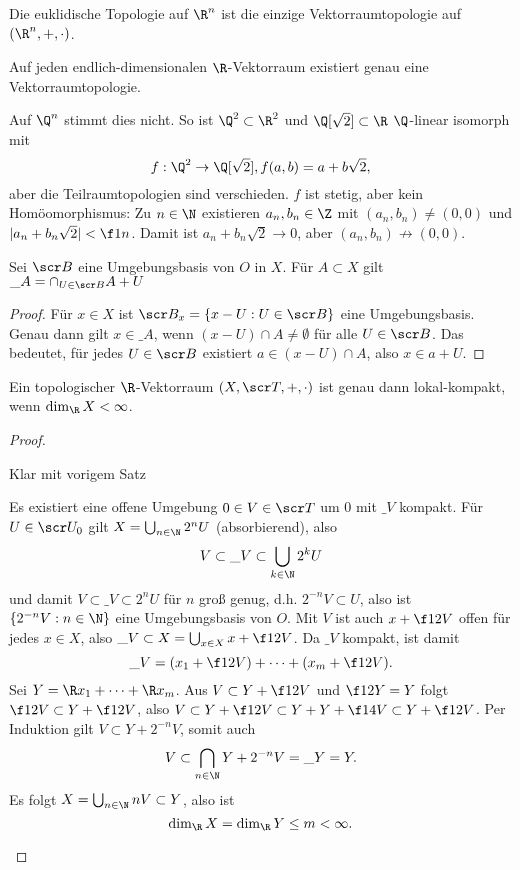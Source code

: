 \begin{kor}
	Die euklidische Topologie auf $\R^n$ ist die einzige Vektorraumtopologie auf $(\R^n, +, \cdot)$.

	Auf jeden endlich-dimensionalen $\R$-Vektorraum existiert genau eine Vektorraumtopologie.
	\begin{note}
		Auf $\Q^n$ stimmt dies nicht.
		So ist $\Q^2 \subset \R^2$ und $\Q[\sqrt 2] \subset \R$ $\Q$-linear isomorph mit
		\[
			f: \Q^2 \to \Q[\sqrt 2], f(a,b) = a + b \sqrt{2},
		\]
		aber die Teilraumtopologien sind verschieden.
		$f$ ist stetig, aber kein Homöomorphismus:
		Zu $n \in \N$ existieren $a_n, b_n \in \Z$ mit $(a_n, b_n) \neq (0,0)$ und $|a_n + b_n \sqrt{2}| < \f 1n$.
		Damit ist $a_n + b_n \sqrt{2} \to 0$, aber $(a_n, b_n) \not\to (0,0)$.
	\end{note}
\end{kor}

\begin{lem}
	Sei $\scr B$ eine Umgebungsbasis von $O$ in $X$.
	Für $A \subset X$ gilt $\_A = \cap_{U \in \scr B} A + U$
	\begin{proof}
		Für $x \in X$ ist $\scr B_x = \{ x - U : U \in \scr B\}$ eine Umgebungsbasis.
		Genau dann gilt $x \in \_A$, wenn $(x-U) \cap A \neq \emptyset$ für alle $U \in \scr B$.
		Das bedeutet, für jedes $U \in \scr B$ existiert $a \in (x-U) \cap A$, also $x \in a + U$.
	\end{proof}
\end{lem}

\begin{st}
	Ein topologischer $\R$-Vektorraum $(X, \scr T, +, \cdot)$ ist genau dann lokal-kompakt, wenn $\dim_{\R} X < \infty$.
	\begin{proof}
		\begin{segnb}[„$\impliedby$“]
			Klar mit vorigem Satz
		\end{segnb}
		\begin{segnb}[„$\implies$“]
			Es existiert eine offene Umgebung $0 \in V \in \scr T$ um $0$ mit $\_V$ kompakt.
			Für $U \in \scr U_0$ gilt $X = \bigcup_{n\in\N} 2^n U$ (absorbierend), also
			\[
				V \subset \_V \subset \bigcup_{k\in\N}2^k U
			\]
			und damit $V \subset \_V \subset 2^n U$ für $n$ groß genug, d.h. $2^{-n} V \subset U$, also ist $\{2^{-n} V : n\in \N\}$ eine Umgebungsbasis von $O$.
			Mit $V$ ist auch $x + \f 12 V$ offen für jedes $x \in X$, also $\_V \subset X = \bigcup_{x\in X} x + \f 12 V$.
			Da $\_V$ kompakt, ist damit
			\[
				\_V = (x_1 + \f 12 V) + \dotsb + (x_m + \f 12 V).
			\]
			Sei $Y = \R x_1 + \dotsb + \R x_m$.
			Aus $V \subset Y + \f 12 V$ und $\f 12 Y = Y$ folgt $\f 12 V \subset Y + \f 12 V$, also $V \subset Y + \f 12 V \subset Y + Y + \f 14 V \subset Y + \f 12 V$.
			Per Induktion gilt $V \subset Y + 2^{-n}V$, somit auch
			\[
				V
				\subset \bigcap_{n\in\N} Y + 2^{-n} V
				= \_Y
				= Y.
			\]
			Es folgt $X = \bigcup_{n\in\N} nV \subset Y$, also ist
			\[
				\dim_{\R} X = \dim_{\R} Y \le m < \infty.
			\]
		\end{segnb}
	\end{proof}
\end{st}


